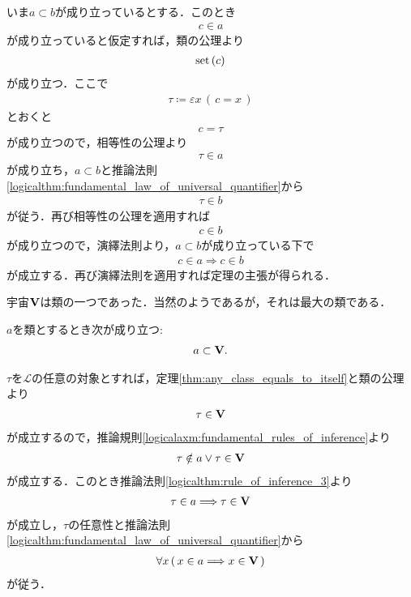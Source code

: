 	\begin{prf}	
		いま$a \subset b$が成り立っているとする．このとき
		\begin{align}
			c \in a
		\end{align}
		が成り立っていると仮定すれば，類の公理より
		\begin{align}
			\operatorname*{set} \left(c\right)
		\end{align}
		が成り立つ．ここで
		\begin{align}
			\tau \coloneqq \varepsilon x\, (\, c=x\, )
		\end{align}
		とおくと
		\begin{align}
			c = \tau
		\end{align}
		が成り立つので，相等性の公理より
		\begin{align}
			\tau \in a
		\end{align}
		が成り立ち，$a \subset b$と推論法則\ref{logicalthm:fundamental_law_of_universal_quantifier}から
		\begin{align}
			\tau \in b
		\end{align}
		が従う．再び相等性の公理を適用すれば
		\begin{align}
			c \in b
		\end{align}
		が成り立つので，演繹法則より，$a \subset b$が成り立っている下で
		\begin{align}
			c \in a \Longrightarrow c \in b
		\end{align}
		が成立する．再び演繹法則を適用すれば定理の主張が得られる．
		\QED
	\end{prf}
	
	宇宙$\mathbf{V}$は類の一つであった．当然のようであるが，それは最大の類である．
	\begin{screen}
		\begin{thm}
			$a$を類とするとき次が成り立つ:
			\begin{align}
				a \subset \mathbf{V}.
			\end{align}
		\end{thm}
	\end{screen}
	
	\begin{prf}
		$\tau$を$\mathcal{L}$の任意の対象とすれば，定理\ref{thm:any_class_equals_to_itself}と類の公理より
		\begin{align}
			\tau \in \mathbf{V}
		\end{align}
		が成立するので，推論規則\ref{logicalaxm:fundamental_rules_of_inference}より
		\begin{align}
			\tau \notin a \vee \tau \in \mathbf{V}
		\end{align}
		が成立する．このとき推論法則\ref{logicalthm:rule_of_inference_3}より
		\begin{align}
			\tau \in a \Longrightarrow \tau \in \mathbf{V}
		\end{align}
		が成立し，$\tau$の任意性と推論法則\ref{logicalthm:fundamental_law_of_universal_quantifier}から
		\begin{align}
			\forall x\, (\, x \in a \Longrightarrow x \in \mathbf{V}\, )
		\end{align}
		が従う．
		\QED
	\end{prf}
	
